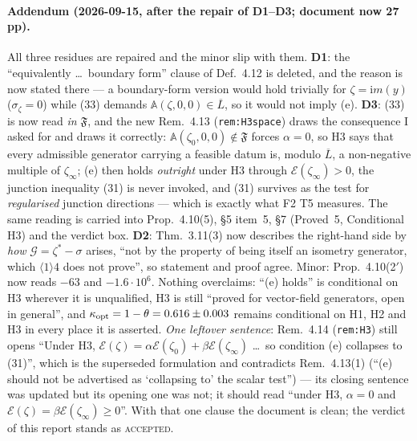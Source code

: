 \documentclass[11pt]{article}
\newcommand{\Aop}{\mathbb A}
\begin{document}
\paragraph{Addendum (2026-09-15, after the repair of D1--D3; document now 27\,pp).}
All three residues are repaired and the minor slip with them.  \textbf{D1}: the
``equivalently \dots\ boundary form'' clause of Def.~4.12 is deleted, and the reason is now
stated there --- a boundary-form version would hold trivially for $\zeta=\mathrm im(y)$
($\sigma_\zeta=0$) while (33) demands $\Aop(\zeta,0,0)\in\overline L$, so it would not imply
(e).  \textbf{D3}: (33) is now read \emph{in $\mathfrak F$}, and the new Rem.~4.13
(\texttt{rem:H3space}) draws the consequence I asked for and draws it correctly:
$\Aop(\zeta_0,0,0)\notin\mathfrak F$ forces $\alpha=0$, so H3 says that every admissible
generator carrying a feasible datum is, modulo $\overline L$, a non-negative multiple of
$\zeta_\infty$; (e) then holds \emph{outright} under H3 through
$\mathcal E(\zeta_\infty)>0$, the junction inequality (31) is never invoked, and (31)
survives as the test for \emph{regularised} junction directions --- which is exactly what F2
T5 measures.  The same reading is carried into Prop.~4.10(5), \S5 item~5, \S7 (Proved~5,
Conditional H3) and the verdict box.  \textbf{D2}: Thm.~3.11(3) now describes the
right-hand side by \emph{how} $\mathcal G=\zeta^*-\sigma$ arises, ``not by the property of
being itself an isometry generator, which $\langle1\rangle4$ does not prove'', so statement
and proof agree.  Minor: Prop.~4.10(2$'$) now reads $-63$ and $-1.6\cdot10^{6}$.  Nothing
overclaims: ``(e) holds'' is conditional on H3 wherever it is unqualified, H3 is still
``proved for vector-field generators, open in general'', and
$\kappa_{\rm opt}=1-\theta=0.616\pm0.003$ remains conditional on H1, H2 and H3 in every
place it is asserted.  \emph{One leftover sentence}: Rem.~4.14 (\texttt{rem:H3}) still opens
``Under H3, $\mathcal E(\zeta)=\alpha\mathcal E(\zeta_0)+\beta\mathcal E(\zeta_\infty)$
\dots\ so condition (e) collapses to (31)'', which is the superseded formulation and
contradicts Rem.~4.13(1) (``(e) should not be advertised as `collapsing to' the scalar
test'') --- its closing sentence was updated but its opening one was not; it should read
``under H3, $\alpha=0$ and $\mathcal E(\zeta)=\beta\mathcal E(\zeta_\infty)\ge0$''.  With
that one clause the document is clean; the verdict of this report stands as
\textsc{accepted}.
\end{document}
